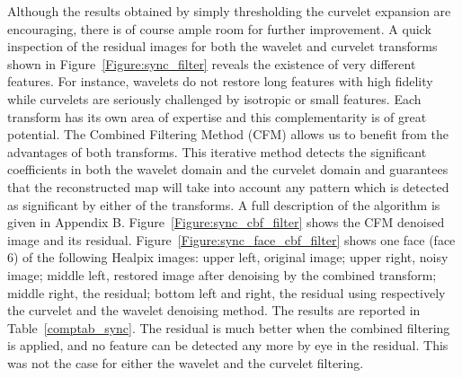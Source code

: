 Although the results obtained by simply thresholding the curvelet expansion are encouraging, there is of course ample room for further
improvement. A quick inspection of the residual images for both the wavelet and curvelet transforms shown in Figure~\ref{Figure:sync_filter}
reveals the existence of very different features. For instance, wavelets do not restore long features with high fidelity while curvelets
are seriously challenged by isotropic or small features. Each transform has its own area of expertise and this complementarity is of great 
potential. The Combined Filtering Method (CFM) \cite{starck:spie01a} allows us to benefit from the advantages of both transforms. This iterative 
method detects the significant coefficients in both the wavelet domain and the curvelet domain and guarantees that the reconstructed map will 
take into account any pattern which is detected as significant by either of the transforms. A full description of the algorithm is given in Appendix B.
Figure~\ref{Figure:sync_cbf_filter} shows the CFM denoised image and its residual. { Figure~\ref{Figure:sync_face_cbf_filter} shows one face 
(face 6) of the following Healpix images: upper left, original image; upper right, noisy image; middle left, restored image after denoising 
by the combined transform; middle right, the residual; bottom left and right, the residual using respectively the curvelet and the wavelet 
denoising method. } The results are reported in Table~\ref{comptab_sync}. The residual is much better when the combined filtering is applied, 
and no feature can be detected any more by eye in the residual. This was not the case for either the wavelet and the curvelet filtering.

